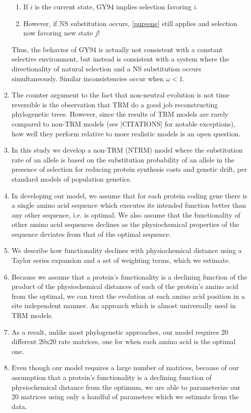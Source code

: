 \documentclass{article}
\begin{document}
\begin{enumerate}
\begin{enumerate}
    \item If $i$ is the current state, GY94 implies selection favoring $i$. \label{pureone}
    \item However, if NS substitution occurs, \ref{pureone} still applies and selection now favoring new state $j$!
    \end{enumerate}
Thus, the behavior of GY94 is actually not consistent with a constant selective environment, but instead is consistent with a system where the directionality of natural selection and a NS substitution occurs simultaneously.
Similar inconsistencies occur when $\omega < 1$.
\item The counter argument to the fact that non-neutral evolution is not time reversible is the observation that TRM do a good job reconstructing phylogenetic trees. 
However, since the results of TRM models are rarely compared to non-TRM models (see [CITATIONS] for notable exceptions), how well they perform relative to more realistic models is an open question.
\item In this study we develop a non-TRM (NTRM) model where the substitution rate of an allele is based on the substitution probability of an allele in the presence of selection for reducing protein synthesis costs and genetic drift, per standard models of population genetics.
\item In developing our model, we assume that for each protein coding gene there is a single amino acid sequence which executes its intended function better than any other sequence, i.e. is optimal.
We also assume that the functionality of other amino acid sequences declines as the physiochemical properties of the sequence deviates from that of the optimal sequence.
\item We describe how functionality  declines with physiochemical distance using a Taylor series expansion and a set of weighting terms, which we estimate.
\item Because we assume that a protein's functionality is a declining function of the product of the physiochemical distances of each of the protein's amino acid from the optimal, we can treat the evolution at each amino acid position in a site independent manner. 
An approach which is almost universally used in TRM models.
\item As a result, unlike most phylogenetic approaches, our model requires 20 different 20x20 rate matrices, one for when each amino acid is the optimal one.
\item Even though our model requires a large number of matrices, because of our assumption that a protein's functionality is a declining function of physiochemical distance from the optimum, we are able to parameterize our 20 matrices using only a handful of parameters which we estimate from the data.

\end{enumerate}
\end{document}
